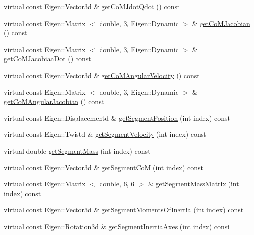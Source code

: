 \begin{DoxyCompactItemize}
\item 
virtual const \-Eigen\-::\-Vector3d \& \hyperlink{classocra__icub_1_1OcraWbiModel_a0985fe02b87fa9bcf90439163c622a71}{get\-Co\-M\-Jdot\-Qdot} () const 
\item 
virtual const \-Eigen\-::\-Matrix\*
$<$ double, 3, \-Eigen\-::\-Dynamic $>$ \& \hyperlink{classocra__icub_1_1OcraWbiModel_abc79b9dec9e96e4e8125d26c6be479d6}{get\-Co\-M\-Jacobian} () const 
\item 
virtual const \-Eigen\-::\-Matrix\*
$<$ double, 3, \-Eigen\-::\-Dynamic $>$ \& \hyperlink{classocra__icub_1_1OcraWbiModel_acc2992d42ea92d55e172622c83ec1bdc}{get\-Co\-M\-Jacobian\-Dot} () const 
\item 
virtual const \-Eigen\-::\-Vector3d \& \hyperlink{classocra__icub_1_1OcraWbiModel_a98c163c5f051c36b78ff24810421664c}{get\-Co\-M\-Angular\-Velocity} () const 
\item 
virtual const \-Eigen\-::\-Matrix\*
$<$ double, 3, \-Eigen\-::\-Dynamic $>$ \& \hyperlink{classocra__icub_1_1OcraWbiModel_aede9be679109798e7342351d13ffdfcd}{get\-Co\-M\-Angular\-Jacobian} () const 
\item 
virtual const \*
\-Eigen\-::\-Displacementd \& \hyperlink{classocra__icub_1_1OcraWbiModel_ad6b33c312d04c4bba05e0df67d8bae06}{get\-Segment\-Position} (int index) const 
\item 
virtual const \-Eigen\-::\-Twistd \& \hyperlink{classocra__icub_1_1OcraWbiModel_a273d90e5ad6d3c1e849b996b1cfc1860}{get\-Segment\-Velocity} (int index) const 
\item 
virtual double \hyperlink{classocra__icub_1_1OcraWbiModel_a2d04857d60138f1664b7828e0d3a307d}{get\-Segment\-Mass} (int index) const 
\item 
virtual const \-Eigen\-::\-Vector3d \& \hyperlink{classocra__icub_1_1OcraWbiModel_a2e2dc6611ff436dcd09ba979197e712d}{get\-Segment\-Co\-M} (int index) const 
\item 
virtual const \-Eigen\-::\-Matrix\*
$<$ double, 6, 6 $>$ \& \hyperlink{classocra__icub_1_1OcraWbiModel_af5849bc569b86523cf515a031b5e14a7}{get\-Segment\-Mass\-Matrix} (int index) const 
\item 
virtual const \-Eigen\-::\-Vector3d \& \hyperlink{classocra__icub_1_1OcraWbiModel_a383b0fc03ffb220899aba6b25fcb6272}{get\-Segment\-Moments\-Of\-Inertia} (int index) const 
\item 
virtual const \-Eigen\-::\-Rotation3d \& \hyperlink{classocra__icub_1_1OcraWbiModel_ad9f9d9013433b1bbf5a59914bee38b14}{get\-Segment\-Inertia\-Axes} (int index) const 
\item 

\end{DoxyCompactItemize}
